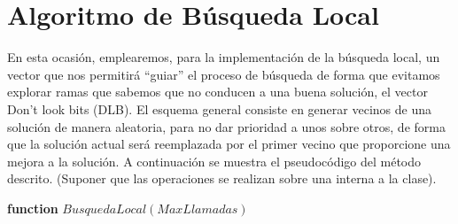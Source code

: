 \documentclass[11pt,a4paper]{article}
\begin{document}
\clearpage
		
\section{Algoritmo de Búsqueda Local}
		
	\noindent En esta ocasión, emplearemos, para la implementación de la búsqueda local, un vector que nos permitirá ``guiar'' el proceso de búsqueda de forma que evitamos explorar ramas que sabemos que no conducen a una buena solución, el vector Don't look bits (DLB). El esquema general consiste en generar vecinos de una solución de manera aleatoria, para no dar prioridad a unos sobre otros, de forma que la solución actual será reemplazada por el primer vecino que proporcione una mejora a la solución. A continuación se muestra el pseudocódigo del método descrito. (Suponer que las operaciones se realizan sobre una interna a la clase).
		
	\begin{algorithm} [!h]
		
		\textbf{function} $BusquedaLocal(MaxLlamadas)$
		
	\end{algorithm}
		
\end{document}
